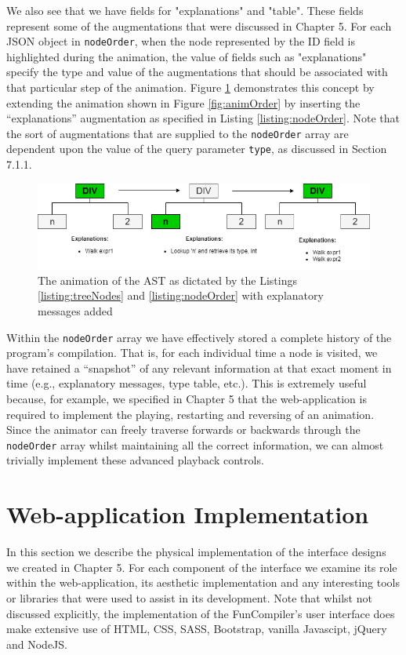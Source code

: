 \documentclass{l4proj}
\begin{document}
We also see that we have fields for "explanations" and "table". These fields represent some of the augmentations that were discussed in Chapter 5. For each JSON object in \texttt{nodeOrder}, when the node represented by the ID field is highlighted during the animation, the value of fields such as "explanations" specify the type and value of the augmentations that should be associated with that particular step of the animation. Figure \ref{fig:animAugs} demonstrates this concept by extending the animation shown in Figure \ref{fig:animOrder} by inserting the ``explanations'' augmentation as specified in Listing \ref{listing:nodeOrder}. Note that the sort of augmentations that are supplied to the \texttt{nodeOrder} array are dependent upon the value of the query parameter \texttt{type}, as discussed in Section 7.1.1.
\begin{figure}[h]
\centering
\includegraphics[scale=0.5]{images/animAugs.png}
\caption{The animation of the AST as dictated by the Listings \ref{listing:treeNodes} and \ref{listing:nodeOrder} with explanatory messages added}
\label{fig:animAugs}	
\end{figure}

Within the \texttt{nodeOrder} array we have effectively stored a complete history of the program's compilation. That is, for each individual time a node is visited, we have retained a ``snapshot'' of any relevant information at that exact moment in time (e.g., explanatory messages, type table, etc.). This is extremely useful because, for example, we specified in Chapter 5 that the web-application is required to implement the playing, restarting and reversing of an animation. Since the animator can freely traverse forwards or backwards through the \texttt{nodeOrder} array whilst maintaining all the correct information, we can almost trivially implement these advanced playback controls.

\section{Web-application Implementation}
In this section we describe the physical implementation of the interface designs we created in Chapter 5. For each component of the interface we examine its role within the web-application, its aesthetic implementation and any interesting tools or libraries that were used to assist in its development. Note that whilst not discussed explicitly, the implementation of the FunCompiler's user interface does make extensive use of HTML, CSS, SASS, Bootstrap, vanilla Javascipt, jQuery and NodeJS.
\end{document}
